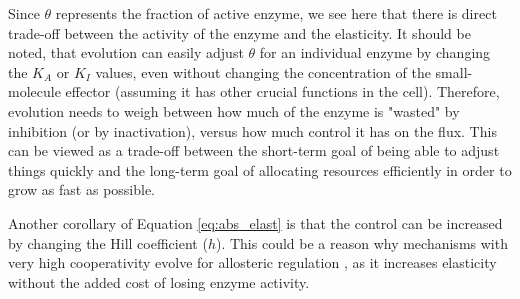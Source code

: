\documentclass[12pt,a4paper]{article}
\begin{document}
Since $\theta$ represents the fraction of active enzyme, we see here that there is direct trade-off between the activity of the enzyme and the elasticity. It should be noted, that evolution can easily adjust $\theta$ for an individual enzyme by changing the $K_A$ or $K_I$ values, even without changing the concentration of the small-molecule effector (assuming it has other crucial functions in the cell). Therefore, evolution needs to weigh between how much of the enzyme is "wasted" by inhibition (or by inactivation), versus how much control it has on the flux. This can be viewed as a trade-off between the short-term goal of being able to adjust things quickly and the long-term goal of allocating resources efficiently in order to grow as fast as possible.

Another corollary of Equation \ref{eq:abs_elast} is that the control can be increased by changing the Hill coefficient ($h$). This could be a reason why mechanisms with very high cooperativity evolve for allosteric regulation \cite{Monod1965-dq}, as it increases elasticity without the added cost of losing enzyme activity.




\end{document}
